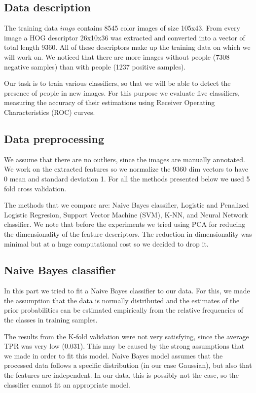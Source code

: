 \subsection{Data description}
The training data $imgs$ contains 8545 color images of size 105x43. From every image a HOG descriptor 26x10x36 was extracted and converted into a vector of total length 9360. All of these descriptors make up the training data on which we will work on.  We noticed that there are more images without people (7308 negative samples) than with people (1237 positive samples).

\noindent Our task is to train various classifiers, so that we will be able to detect the presence of people in new images. For this purpose we evaluate five classifiers, measuring the accuracy of their estimations using Receiver Operating Characteristics (ROC) curves.

\subsection{Data preprocessing}
\noindent We assume that there are no outliers, since the images are manually annotated. We work on the extracted features so we normalize the 9360 dim vectors to have  0 mean and standard deviation 1. For all the methods presented below we used 5 fold cross validation.

The methods that we compare are: Naive Bayes classifier, Logistic and Penalized Logistic Regresion, Support Vector Machine (SVM),  K-NN, and Neural Network classifier. 
We note that before the experiments we tried using PCA for reducing the dimensionality of the feature descriptors. The reduction in dimensionality was minimal but at a huge computational cost so we decided to drop it.
\subsection{Naive Bayes classifier}
\noindent In this part we tried to fit a Naive Bayes classifier to our data. For this, we made the assumption that the data is normally distributed and the estimates of the prior probabilities can be estimated empirically from the relative frequencies of the classes in training samples.

The results from the K-fold validation were not very satisfying, since the average TPR was very low (0.031). This may be caused by the strong assumptions that we made in order to fit this model. Naive Bayes model assumes that the processed data follows a specific distribution (in our case Gaussian), but also that the features are independent. In our data, this is possibly not the case, so the classifier cannot fit an appropriate model.
